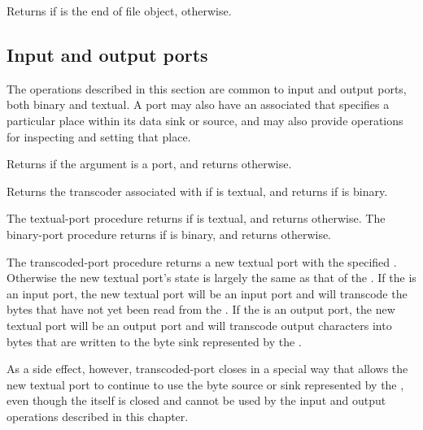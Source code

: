 \begin{entry}{%
}
  
Returns \schtrue{} if  is the end of file object, \schfalse{} otherwise.
\end{entry}

\subsection{Input and output ports}

The operations described in this section are common to input and
output ports, both binary and textual.  A port may also have an
associated  that specifies a particular place
within its data sink or source, and may also provide operations for
inspecting and setting that place.

\begin{entry}{%
}
   
Returns \schtrue{} if the argument is a port, and returns \schfalse{}
otherwise.
\end{entry}

\begin{entry}{%
}

Returns the transcoder associated with  if  is
textual, and returns \schfalse{} if  is binary.
\end{entry}

\begin{entry}{%
}

The {\cf textual-port} procedure returns \schtrue{} if  is
textual, and returns \schfalse{} otherwise.
The {\cf binary-port} procedure returns \schtrue{} if  is
binary, and returns \schfalse{} otherwise.
\end{entry}

\begin{entry}{%
}

The {\cf transcoded-port} procedure
returns a new textual port with the specified .
Otherwise the new textual port's state is largely the same as
that of the .
If the  is an input port, the new textual
port will be an input port and
will transcode the bytes that have not yet been read from
the .
If the  is an output port, the new textual
port will be an output port and
will transcode output characters into bytes that are
written to the byte sink represented by the .

As a side effect, however, {\cf transcoded-port}
closes  in
a special way that allows the new textual port to continue to
use the byte source or sink represented by the ,
even though the  itself is closed and cannot
be used by the input and output operations described in this
chapter.
\end{entry}

